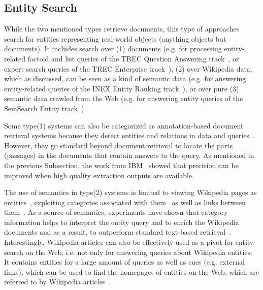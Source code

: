 \subsection{Entity Search} While the two mentioned types retrieve documents, this type of approaches search for entities representing real-world objects (anything objects but documents). It includes search over (1) documents (e.g. for processing entity-related factoid and list queries of the TREC Question Answering track~\cite{DBLP:conf/sigir/Chu-CarrollPCFD06}, or expert search queries of the TREC Enterprise track~\cite{DBLP:journals/ipm/BalogAR09}), 
(2) over 
Wikipedia data, which as discussed, can be seen as a kind of semantic data (e.g. for answering entity-related queries of the INEX Entity Ranking track~\cite{DBLP:conf/cikm/KapteinSVK10,DBLP:conf/ecir/PehcevskiVT08}), or over pure (3) semantic data crawled from the Web (e.g. for answering entity queries of the SemSearch Entity track~\cite{DBLP:conf/semweb/BlancoMV11}).  




Some type(1) systems can also be categorized as annotation-based document retrieval systems because they detect entities and relations in data and queries~\cite{DBLP:conf/vldb/ChengYC07,DBLP:conf/www/NieMSWM07,DBLP:conf/sigir/Chu-CarrollPCFD06}. However, they go standard beyond document retrieval to locate the parts (passages) in the documents that contain answers to the query. As mentioned in the previous Subsection, the work from IBM~\cite{DBLP:conf/sigir/Chu-CarrollPCFD06} showed that precision can be improved when high quality extraction outputs are available. 

The use of semantics in type(2) systems is limited to viewing Wikipedia pages as entities~\cite{DBLP:conf/cikm/KapteinSVK10}, exploiting categories associated with them~\cite{DBLP:journals/tois/BalogBR11} as well as links between them~\cite{DBLP:conf/ecir/PehcevskiVT08}. As a source of semantics, experiments have shown that category information helps to interpret the entity query and to enrich the Wikipedia documents and as a result, to outperform standard text-based retrieval~\cite{DBLP:conf/cikm/KapteinSVK10,DBLP:journals/tois/BalogBR11}. Interestingly, 
Wikipedia articles can also be effectively used as a pivot for entity search on the Web, i.e. not only for answering queries about Wikipedia entities: It contains entities for a large amount of queries as well as cues (e.g. external links), which can be used to find the homepages of entities on the Web, which are referred to by Wikipedia articles~\cite{DBLP:conf/cikm/KapteinSVK10}. 

